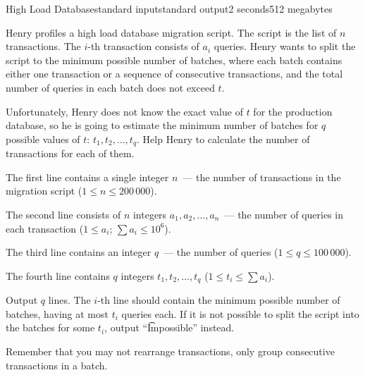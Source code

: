 \begin{problem}{High Load Database}{standard input}{standard output}{2 seconds}{512 megabytes}

Henry profiles a high load database migration script. The script is the list of $n$ transactions. The $i$-th transaction consists of $a_i$ queries. Henry wants to split the script to the minimum possible number of batches, where each batch contains either one transaction or a sequence of consecutive transactions, and the total number of queries in each batch does not exceed $t$.

Unfortunately, Henry does not know the exact value of $t$ for the production database, so he is going to estimate the minimum number of batches for $q$ possible values of $t$: $t_1, t_2, \ldots, t_q$. Help Henry to calculate the number of transactions for each of them.

\InputFile
The first line contains a single integer $n$~--- the number of transactions in the migration script ($1 \le n \le 200\,000$).

The second line consists of $n$ integers $a_1, a_2, \ldots, a_n$~--- the number of queries in each transaction ($1 \le a_i$; $\sum{a_i} \le 10^6$).

The third line contains an integer $q$~--- the number of queries ($1 \le q \le 100\,000$).

The fourth line contains $q$ integers $t_1, t_2, \ldots, t_q$ ($1 \le t_i \le \sum{a_i}$).

\OutputFile
Output $q$ lines. The $i$-th line should contain the minimum possible number of batches, having at most $t_i$ queries each. If it is not possible to split the script into the batches for some $t_i$, output ``\t{Impossible}'' instead.

Remember that you may not rearrange transactions, only group consecutive transactions in a batch.

\Example

\begin{example}
%
\end{example}

\end{problem}


